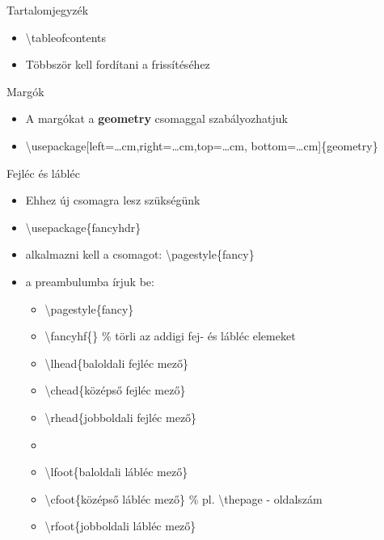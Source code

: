 \documentclass[11pt]{beamer}
\newcommand{\tbs}{\textbackslash}
\begin{document}
\begin{frame}{Tartalomjegyzék}
\begin{itemize}
\item	\tbs tableofcontents
\item	Többször kell fordítani a frissítéséhez
\end{itemize}
\end{frame}


\begin{frame}{Margók}
\begin{itemize}
\item A margókat a \textbf{geometry} csomaggal szabályozhatjuk
\item \tbs usepackage[left=\dots cm,right=\dots cm,top=\dots cm,
bottom=\dots cm]\{geometry\}
\end{itemize}
\end{frame}


\begin{frame}{Fejléc és lábléc}
\begin{itemize}
\item Ehhez új csomagra lesz szükségünk
\item \tbs usepackage\{fancyhdr\}
\item alkalmazni kell a csomagot: \tbs pagestyle\{fancy\}
\item a preambulumba írjuk be:
	\begin{itemize}
	\item \tbs pagestyle\{fancy\}
	\item \tbs fancyhf\{\} \% törli az addigi fej- és lábléc elemeket
	\item \tbs lhead\{baloldali fejléc mező\}
	\item \tbs chead\{középső fejléc mező\}
	\item \tbs rhead\{jobboldali  fejléc mező\}
	\item 
	\item \tbs lfoot\{baloldali lábléc mező\}
	\item \tbs cfoot\{középső lábléc mező\} \% pl. \tbs thepage - oldalszám
	\item \tbs rfoot\{jobboldali  lábléc mező\}
	\end{itemize}
\end{itemize}
\end{frame}
\end{document}

